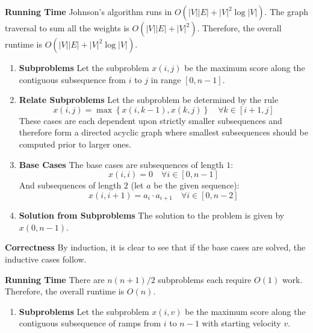 \documentclass[12pt,twoside]{article}
\begin{document}
\begin{problems}
\begin{problemparts}
{\bf Running Time} Johnson's algorithm runs in $O(|V||E| + |V|^2 \log |V|)$.
The graph traversal to sum all the weights is $O(|V||E| + |V|^2)$. Therefore,
the overall runtime is $O(|V||E| + |V|^2 \log |V|)$.

\end{problemparts}

\newpage
{} 
  \begin{enumerate}
    \item {\bf Subproblems} Let the subproblem $x(i, j)$ be the maximum score
    along the contiguous subsequence from $i$ to $j$ in range $[0, n - 1]$.

    \item {\bf Relate Subproblems} Let the subproblem be determined by the
    rule
    $$ x(i, j) = \max\left\{x(i, k - 1), x(k, j)\right\}\quad \forall k \in
    [i + 1, j] $$
    These cases are each dependent upon strictly smaller subsequences and
    therefore form a directed acyclic graph where smallest subsequences
    should be computed prior to larger ones.

    \item {\bf Base Cases} The base cases are subsequences of length $1$:
    $$ x(i, i) = 0\quad \forall i \in [0, n - 1] $$
    And subsequences of length $2$ (let $a$ be the given sequence):
    $$ x(i, i + 1) = a_i \cdot a_{i + 1} \quad \forall i \in [0, n - 2] $$

    \item {\bf Solution from Subproblems} The solution to the problem is
    given by $x(0, n - 1)$.

  \end{enumerate}

{\bf Correctness} By induction, it is clear to see that if the base cases are
solved, the inductive cases follow.

{\bf Running Time} There are $n (n + 1) / 2$ subproblems each require $O(1)$
work. Therefore, the overall runtime is $O(n)$.

\newpage

  \begin{enumerate}
    \item {\bf Subproblems} Let the subproblem $x(i, v)$ be the maximum score
    along the contiguous subsequence of ramps from $i$ to $n - 1$ with
    starting velocity $v$.


\end{enumerate}
\end{problems}
\end{document}
